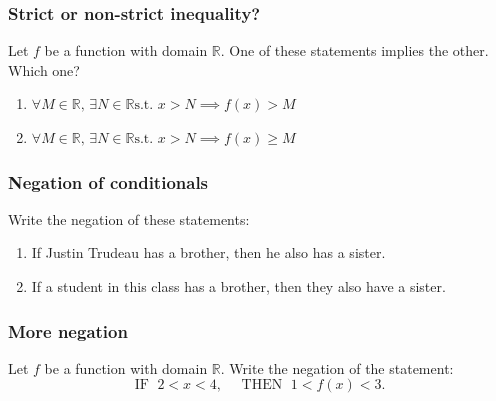 \documentclass[14pt]{beamer}
\begin{document}
	\begin{frame}
		\frametitle{Strict or non-strict inequality?}

		Let $f$ be a function with domain $\mathbb{R}$. One of these statements implies
		the other. Which one?

		\begin{enumerate}
			\item $\displaystyle \forall M \in \mathbb{R}, \, \exists N \in \mathbb{R}\text{
				s.t. }x>N \implies f(x) > M$

			\item $\displaystyle \forall M \in \mathbb{R}, \, \exists N \in \mathbb{R}\text{
				s.t. }x>N \implies f(x) \geq M$
		\end{enumerate}
	\end{frame}


	\begin{frame}
		\frametitle{Negation of conditionals}

		Write the negation of these statements:
		\begin{enumerate}
			\item If Justin Trudeau has a brother, then he also has a sister.

			\item If a student in this class has a brother, then they also have a
				sister.
		\end{enumerate}
	\end{frame}


	\begin{frame}
		\frametitle{More negation}

		Let $f$ be a function with domain $\mathbb{R}$. Write the negation of the statement:
		\begin{equation*}
			\text{IF }\; 2<x<4, \quad \text{ THEN }\; 1<f(x)<3.
		\end{equation*}
	\end{frame}

\end{document}
